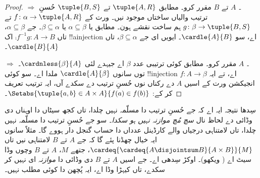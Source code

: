 \documentclass[../../../include/open-logic-section]{subfiles}
\begin{document}
\begin{proof}
\emph{ $\Rightarrow$ ۔} $A$ تے $B$ مقرر کرو۔  مطابق $\tuple{A, R}$ تے $\tuple{B, S}$ حُسنِ ترتیب والیاں ساختاں موجود نیں۔  ورت کے $f \colon
\alpha \to \tuple{A, R}$ تے $g \colon \beta \to \tuple{B, S}$ ہم ساخت نقشے ہون۔  مطابق یا $\alpha \subseteq \beta$ یا $\beta \subseteq \alpha$۔ جے $\alpha \subseteq \beta$، تاں $\comp{f^{-1}}{g} \colon A \to B$ اک !!a{injection} اے، سو $\cardle{A}{B}$۔ ایویں ای جے $\beta \subseteq \alpha$، تاں $\cardle{B}{A}$۔

\emph{ $\Rightarrow$ ۔} $A$ مقرر کرو۔  مطابق کوئی ترتیبی عدد $\beta$ اے جیہدے لئی $\cardnless{\beta}{A}$۔  توں سانوں $\cardle{A}{\beta}$ ملدا اے۔ سو کوئی !!{injection} $f \colon A \to
\beta$ اے، تے ایہ انجیکشن ورت کے اسیں $A$ دے رکناں نوں حُسنِ ترتیب دے سکدے آں، ایہ ترتیب تعریف کر کے: $\Setabs{\tuple{a, b} \in A \times A}{f(a)
\in f(b)}$۔
\end{proof}
\noindent
سِدھا نتیجہ ایہ اے کہ جے حُسنِ ترتیب دا مسلّمہ نہیں چلدا، تاں کجھ سیٹاں دا اوہناں دی وڈائی دے لحاظ نال \emph{سچ مُچ موازنہ نہیں ہو سکدا}۔ سو جے حُسنِ ترتیب دا مسلّمہ نہیں چلدا، تاں لامتناہی درجیاں والے کارڈینل عدداں دا حساب گنجل دار ہووے گا۔ مثلاً سانوں ایہ خیال چھڈنا پئے گا کہ جے $A$ تے $B$ لامتناہی نیں تاں $\cardeq{\cardeq{A \disjointsum B}{A \times
B}}{M}$، جتھے $M$، $A$ تے $B$ وچوں وڈا سیٹ اے ( ویکھو)۔ اوکڑ سِدھی اے۔ جے اسیں $A$ تے $B$ دی وڈائی دا \emph{موازنہ} ای نہیں کر سکدے، تاں کیہڑا وڈا اے، ایہ پُچھن دا کوئی مطلب نہیں۔
\end{document}
